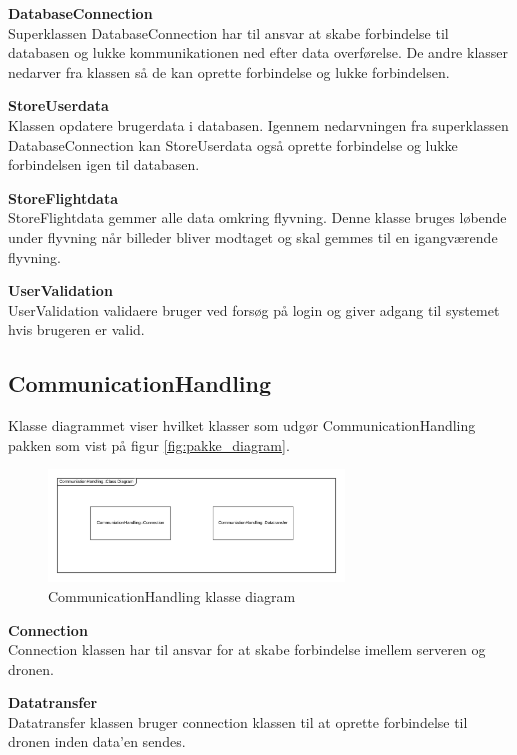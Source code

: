 \textbf{DatabaseConnection}\\
Superklassen DatabaseConnection har til ansvar at skabe forbindelse til databasen og lukke kommunikationen ned efter data overførelse. De andre klasser nedarver fra klassen så de kan oprette forbindelse og lukke forbindelsen.

\textbf{StoreUserdata}\\
Klassen opdatere brugerdata i databasen. Igennem nedarvningen fra superklassen DatabaseConnection kan StoreUserdata også oprette forbindelse og lukke forbindelsen igen til databasen.

\textbf{StoreFlightdata}\\
StoreFlightdata gemmer alle data omkring flyvning. Denne klasse bruges løbende under flyvning når billeder bliver modtaget og skal gemmes til en igangværende flyvning.

\textbf{UserValidation}\\
UserValidation validaere bruger ved forsøg på login og giver adgang til systemet hvis brugeren er valid.

\newpage
\subsection{CommunicationHandling}
Klasse diagrammet viser hvilket klasser som udgør CommunicationHandling pakken som vist på figur \ref{fig:pakke_diagram}.

\vspace{-5pt}
\begin{figure}[H]
	\centering
	\includegraphics[width=0.7\textwidth]{Billeder/klasse_diagrammer/CommunicationHandling.png}
	\vspace{-5pt}
	\caption{CommunicationHandling klasse diagram}
	\label{fig:CommunicationHandling_klasse_diagram}
\end{figure}

\textbf{Connection}\\
Connection klassen har til ansvar for at skabe forbindelse imellem serveren og dronen.

\textbf{Datatransfer}\\
Datatransfer klassen bruger connection klassen til at oprette forbindelse til dronen inden data'en sendes. 
